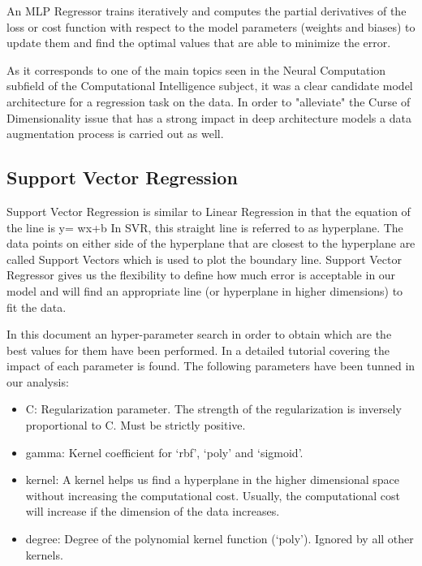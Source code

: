 \documentclass[anon]{CI}
\begin{document}
    An MLP Regressor trains iteratively and computes the partial derivatives of the loss or cost function with respect to the model parameters (weights and biases) to update them and find the optimal values that are able to minimize the error.

    As it corresponds to one of the main topics seen in the Neural Computation subfield of the Computational Intelligence subject, it was a clear candidate model architecture for a regression task on the data. In order to "alleviate" the Curse of Dimensionality issue that has a strong impact in deep architecture models a data augmentation process is carried out as well.

\subsection{Support Vector Regression}

Support Vector Regression is similar to Linear Regression in that the equation of the line is y= wx+b In SVR, this straight line is referred to as hyperplane. The data points on either side of the hyperplane that are closest to the hyperplane are called Support Vectors which is used to plot the boundary line.
Support Vector Regressor gives us the flexibility to define how much error is acceptable in our model and will find an appropriate line (or hyperplane in higher dimensions) to fit the data.

In this document an hyper-parameter search in order to obtain which are the best values for them have been performed. In \cite{Smola04atutorial} a detailed tutorial covering the impact of each parameter is found. The following parameters have been tunned in our analysis:

\begin{itemize}
    \item C: Regularization parameter. The strength of the regularization is inversely proportional to C. Must be strictly positive.
    \item gamma: Kernel coefficient for ‘rbf’, ‘poly’ and ‘sigmoid’.
    \item kernel: A kernel helps us find a hyperplane in the higher dimensional space without increasing the computational cost. Usually, the computational cost will increase if the dimension of the data increases.
    \item degree: Degree of the polynomial kernel function (‘poly’). Ignored by all other kernels.
\end{itemize}
\end{document}
